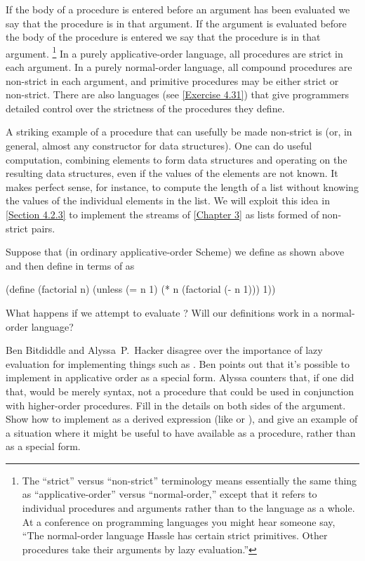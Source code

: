 If the body of a procedure is entered before an argument has been evaluated we say that the procedure is  in that argument.
If the argument is evaluated before the body of the procedure is entered we say that the procedure is  in that argument.%
\footnote{
	The “strict” versus “non-strict” terminology means essentially the same thing as “applicative-order”  versus  “normal-order,” except that it refers to individual procedures and arguments rather than to the language as a whole.
	At a conference on programming languages you might hear someone say, “The normal-order language Hassle has certain strict primitives.
	Other procedures take their arguments by lazy evaluation.”
}
In a purely applicative-order language, all procedures are strict in each argument.
In a purely normal-order language, all compound procedures are non-strict in each argument, and primitive procedures may be either strict or non-strict.
There are also languages (see \cref{Exercise 4.31}) that give programmers detailed control over the strictness of the procedures they define.

A striking example of a procedure that can usefully be made non-strict is  (or, in general, almost any constructor for data structures).
One can do useful computation, combining elements to form data structures and operating on the resulting data structures, even if the values of the elements are not known.
It makes perfect sense, for instance, to compute the length of a list without knowing the values of the individual elements in the list.
We will exploit this idea in \cref{Section 4.2.3} to implement the streams of \cref{Chapter 3} as lists formed of non-strict  pairs.



\begin{exercise}
	\label{Exercise 4.25}
	Suppose that (in ordinary applicative-order Scheme) we define  as shown above and then define  in terms of  as
	\begin{scheme}
	  (define (factorial n)
	    (unless (= n 1)
	            (* n (factorial (- n 1)))
	            1))
	\end{scheme}
	What happens if we attempt to evaluate ?
	Will our definitions work in a normal-order language?
\end{exercise}



\begin{exercise}
	\label{Exercise 4.26}
	Ben Bitdiddle and Alyssa P. Hacker disagree over the importance of lazy evaluation for implementing things such as .
	Ben points out that it’s possible to implement  in applicative order as a special form.
	Alyssa counters that, if one did that,  would be merely syntax, not a procedure that could be used in conjunction with higher-order procedures.
	Fill in the details on both sides of the argument.
	Show how to implement  as a derived expression (like  or ), and give an example of a situation where it might be useful to have  available as a procedure, rather than as a special form.
\end{exercise}
